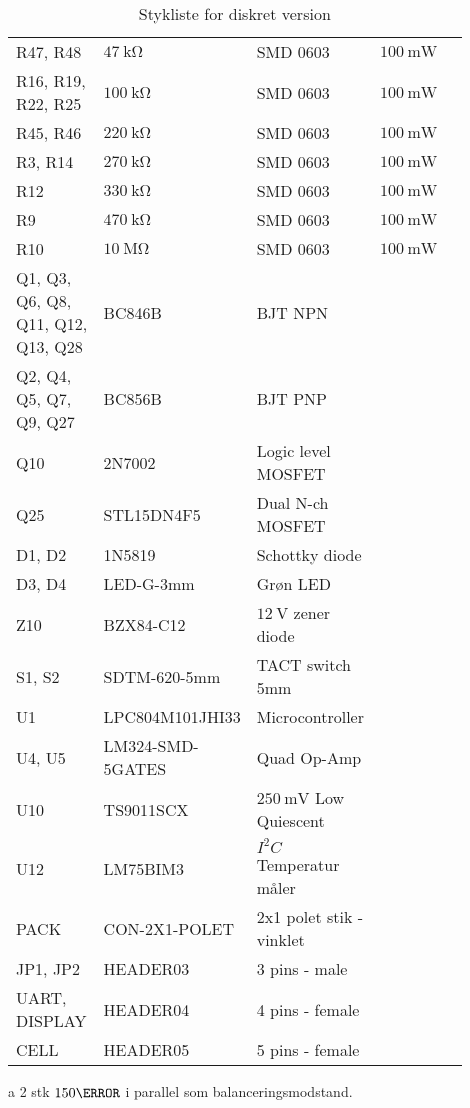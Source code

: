 \begin{table}[h!]
\begin{threeparttable}
\begin{tabular}{p{0.25\linewidth}p{0.2\linewidth}p{0.25\linewidth}p{0.15\linewidth}p{0.05\linewidth}}
R47, R48 & $\SI{47}{\kilo\ohm}$ & SMD 0603 & $\SI{100}{\milli\watt}$  \\
R16, R19, R22, R25 & $\SI{100}{\kilo\ohm}$ & SMD 0603 & $\SI{100}{\milli\watt}$  \\
R45, R46 & $\SI{220}{\kilo\ohm}$ & SMD 0603 & $\SI{100}{\milli\watt}$  \\
R3, R14 & $\SI{270}{\kilo\ohm}$ & SMD 0603 & $\SI{100}{\milli\watt}$  \\
R12 & $\SI{330}{\kilo\ohm}$ & SMD 0603 & $\SI{100}{\milli\watt}$  \\
R9 & $\SI{470}{\kilo\ohm}$ & SMD 0603 & $\SI{100}{\milli\watt}$  \\
R10 & $\SI{10}{\mega\ohm}$ & SMD 0603 & $\SI{100}{\milli\watt}$  \\
\midrule

Q1, Q3, Q6, Q8, Q11, Q12, Q13, Q28 & BC846B & BJT NPN &   \\
Q2, Q4, Q5, Q7, Q9, Q27 & BC856B & BJT PNP &   \\
Q10 & 2N7002 & Logic level MOSFET &   \\
Q25 & STL15DN4F5 & Dual N-ch MOSFET &   \\

\midrule
D1, D2 & 1N5819 & Schottky diode &   \\
D3, D4 & LED-G-3mm  & Grøn LED &   \\
Z10 & BZX84-C12 & $\SI{12}{\volt}$ zener diode&   \\
S1, S2 & SDTM-620-5mm  & TACT switch 5mm &   \\
U1 & LPC804M101JHI33 & Microcontroller &   \\
U4, U5 & LM324-SMD-5GATES & Quad Op-Amp &   \\
U10 & TS9011SCX & $\SI{250}{\milli\volt}$ Low Quiescent &   \\
U12 & LM75BIM3 & $I^{2}C$ Temperatur måler &   \\
PACK & CON-2X1-POLET & 2x1 polet stik - vinklet &   \\
JP1, JP2 & HEADER03 & 3 pins - male &   \\
UART, DISPLAY & HEADER04 & 4 pins - female &   \\
CELL & HEADER05 & 5 pins - female &   \\

\hline
\bottomrule
\end{tabular}
\begin{tablenotes}
\item[a] 2 stk $150\ohm$ i parallel som balanceringsmodstand.
\end{tablenotes}
\end{threeparttable}
\caption{Stykliste for diskret version}
\end{table} 
